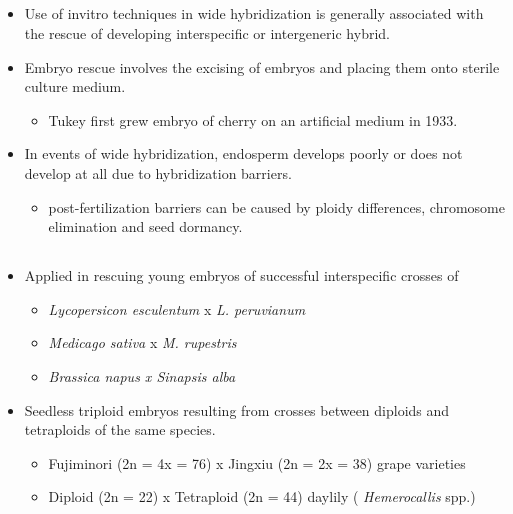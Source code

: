\documentclass[
  ignorenonframetext,
  aspectratio=169]{beamer}
\providecommand{\tightlist}{%
  \setlength{\itemsep}{0pt}\setlength{\parskip}{0pt}}
\begin{document}
\hypertarget{section-10}{%
\subsection{}\label{section-10}}

\begin{frame}{}
\begin{itemize}
\tightlist
\item
  Use of invitro techniques in wide hybridization is generally
  associated with the rescue of developing interspecific or intergeneric
  hybrid.
\item
  Embryo rescue involves the excising of embryos and placing them onto
  sterile culture medium.

  \begin{itemize}
  \tightlist
  \item
    Tukey first grew embryo of cherry on an artificial medium in 1933.
  \end{itemize}
\item
  In events of wide hybridization, endosperm develops poorly or does not
  develop at all due to hybridization barriers.

  \begin{itemize}
  \tightlist
  \item
    post-fertilization barriers can be caused by ploidy differences,
    chromosome elimination and seed dormancy.
  \end{itemize}
\end{itemize}
\end{frame}

\hypertarget{section-11}{%
\subsection{}\label{section-11}}

\begin{frame}{}
\begin{itemize}
\tightlist
\item
  Applied in rescuing young embryos of successful interspecific crosses
  of

  \begin{itemize}
  \tightlist
  \item
    \emph{Lycopersicon esculentum} x \emph{L. peruvianum}
  \item
    \emph{Medicago sativa} x \emph{M. rupestris}
  \item
    \emph{Brassica napus x Sinapsis alba}
  \end{itemize}
\item
  Seedless triploid embryos resulting from crosses between diploids and
  tetraploids of the same species.

  \begin{itemize}
  \tightlist
  \item
    Fujiminori (2n = 4x = 76) x Jingxiu (2n = 2x = 38) grape varieties
  \item
    Diploid (2n = 22) x Tetraploid (2n = 44) daylily (
    \emph{Hemerocallis} spp.)
  \end{itemize}
\end{itemize}
\end{frame}
\end{document}
